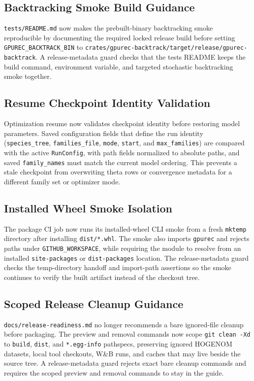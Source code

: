 \documentclass[11pt]{article}
\begin{document}
\subsection{Backtracking Smoke Build Guidance}

\texttt{tests/README.md} now makes the prebuilt-binary backtracking smoke
reproducible by documenting the required locked release build before setting
\texttt{GPUREC\_BACKTRACK\_BIN} to
\texttt{crates/gpurec-backtrack/target/release/gpurec-backtrack}.  A
release-metadata guard checks that the tests README keeps the build command,
environment variable, and targeted stochastic backtracking smoke together.

\subsection{Resume Checkpoint Identity Validation}

Optimization resume now validates checkpoint identity before restoring model
parameters.  Saved configuration fields that define the run identity
(\texttt{species\_tree}, \texttt{families\_file}, \texttt{mode},
\texttt{start}, and \texttt{max\_families}) are compared with the active
\texttt{RunConfig}, with path fields normalized to absolute paths, and saved
\texttt{family\_names} must match the current model ordering.  This prevents a
stale checkpoint from overwriting theta rows or convergence metadata for a
different family set or optimizer mode.

\subsection{Installed Wheel Smoke Isolation}

The package CI job now runs its installed-wheel CLI smoke from a fresh
\texttt{mktemp} directory after installing \texttt{dist/*.whl}.  The smoke also
imports \texttt{gpurec} and rejects paths under \texttt{GITHUB\_WORKSPACE},
while requiring the module to resolve from an installed
\texttt{site-packages} or \texttt{dist-packages} location.  The release-metadata
guard checks the temp-directory handoff and import-path assertions so the smoke
continues to verify the built artifact instead of the checkout tree.

\subsection{Scoped Release Cleanup Guidance}

\texttt{docs/release-readiness.md} no longer recommends a bare ignored-file
cleanup before packaging.  The preview and removal commands now scope
\texttt{git clean -Xd} to \texttt{build}, \texttt{dist}, and
\texttt{*.egg-info} pathspecs, preserving ignored HOGENOM datasets, local tool
checkouts, W\&B runs, and caches that may live beside the source tree.  A
release-metadata guard rejects exact bare cleanup commands and requires the
scoped preview and removal commands to stay in the guide.
\end{document}
